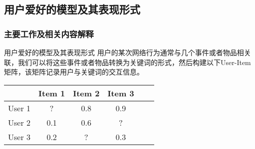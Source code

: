 \documentclass{beamer}
\begin{document}
\subsection{用户爱好的模型及其表现形式}
\begin{frame}
\frametitle{主要工作及相关内容解释}
	\begin{block}{用户爱好的模型及其表现形式}
	用户的某次网络行为通常与几个事件或者物品相关联，我们可以将这些事件或者物品转换为关键词的形式，然后构建以下User-Item矩阵，该矩阵记录用户与关键词的交互信息。
	\begin{center}
		\begin{tabular}{@{} c @{}|@{} c @{}|@{} c @{}|@{} c @{}|@{} c @{}|@{} c @{}}
			\hline
			 & Item 1 & Item 2 & Item 3 \\
			\hline
			User 1 & ? & 0.8 & 0.9 \\
			\hline
			User 2 & 0.1 & 0.6 & ? \\
			\hline
			User 3 & 0.2 & ? & 0.3 \\
			\hline
		\end{tabular}
		\end{center}
	\end{block}
\end{frame}
\end{document}
